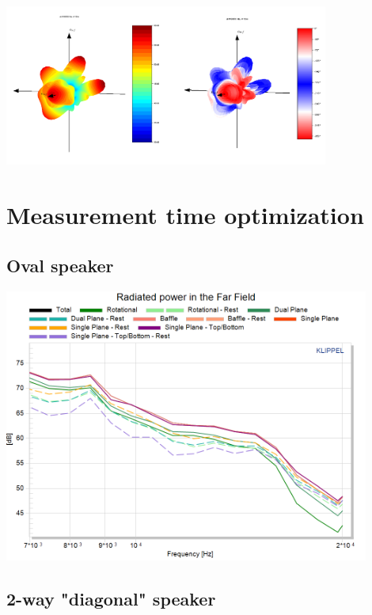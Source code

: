 \documentclass{report}
\begin{document}
\begin{appendices}
\begin{center}
	\includegraphics[width=0.8\textwidth]{Appendix/compa_baffle_Vib_SpkrWood_All}
    \captionsetup{hypcap=false}
    \label{Curves:Baffle_BalloonWood}
\end{center}



\section{Measurement time optimization}
\subsection{Oval speaker}
\label{Curves:oval}
\begin{center}
	\includegraphics[width=0.9\textwidth]{Appendix/Rad_Pow_OvalSpkr_ZoomHF}
    \captionsetup{hypcap=false}
\end{center}

\subsection{2-way "diagonal" speaker}


\end{appendices}
\end{document}

